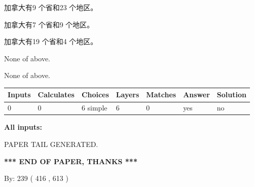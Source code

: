 \documentclass{ctexart}
\begin{document}
 
加拿大有9 个省和23 个地区。
 
 
加拿大有7 个省和9 个地区。
 
 
加拿大有19 个省和4 个地区。
 
 
 None of above.
 
 
\noindent{}
 
 
 None of above.
 
 
\noindent{}
 
 
   
   
   
   
\noindent\begin{tabular}{|l|l|l|l|l|l|l|}
 \hline
Inputs & Calculates & Choices & Layers & Matches & Answer & Solution \\ \hline
 0  & 
 0  & 
 6
  simple  
  & 
 6  & 
 0  & 
  yes & 
  no 
  \\ \hline
 \end{tabular}
   
   
   
   
\noindent{}
   
   
   
   
\noindent\vspace{0.1in}\hspace{-0.08in} {\textbf{\Large{All inputs: }}}
   
   
   
   
   
   
 \vspace{0.2in}
 
   
   
\vspace{2.0in} PAPER TAIL GENERATED.
   
   
   
   
\vspace{1.0in} 
{\textbf{\large{ *** END OF PAPER, THANKS *** }}} 
   
   
\hspace{1.0in} By: 
 239 ( 416 ,  613 )
   
   
   
   
\newpage 
\setcounter{page}{ 
   602001 } 
   
\end{document}
